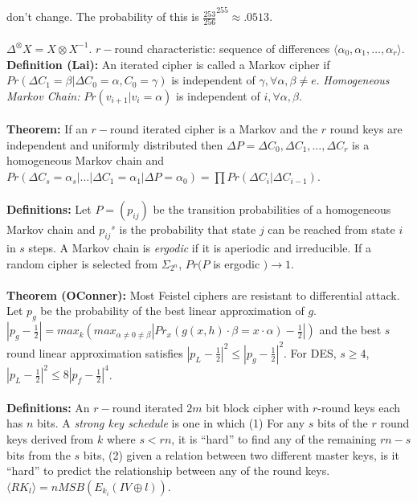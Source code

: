 don't change.  The probability of this is ${\frac {253} {256}}^{255} \approx .0513$.
\\
\\
$\Delta^{\otimes}X =  X \otimes X^{-1}$.  $r-$round characteristic:  sequence of differences
$\langle \alpha_0, \alpha_1 , \ldots , \alpha_r \rangle$.
{\bf Definition (Lai):} An iterated cipher is called a Markov cipher if 
$Pr( \Delta C_1= \beta | \Delta C_0= \alpha, C_0= \gamma)$ is independent of 
$\gamma, \forall \alpha , \beta \ne e$.  \emph{Homogeneous Markov Chain:}
$Pr(v_{i+1} | v_i= \alpha)$ is independent of $i, \forall \alpha, \beta$.
\\
\\
{\bf Theorem:}
If an $r-$round iterated cipher is a Markov and the $r$ round keys are independent and
uniformly distributed then $\Delta P= \Delta C_0, \Delta C_1 , \ldots, \Delta C_r$
is a homogeneous Markov chain and
$Pr(\Delta C_s = \alpha_s | \ldots | \Delta C_1= \alpha_1 | \Delta P= \alpha_0)
= \prod Pr(\Delta C_i | \Delta C_{i-1})$.
\\
\\
{\bf Definitions:}
Let $P= (p_{ij})$ be the transition probabilities of a homogeneous Markov chain and
${p_{ij}}^s$ is the probability that state $j$ can be reached from state $i$ in
$s$ steps.  A Markov chain is \emph{ergodic} if it is aperiodic and irreducible.
If a random cipher is selected from $\Sigma_{2^n}$, $Pr( P$ is ergodic $) \rightarrow 1$.
\\
\\
{\bf Theorem (OConner):} Most Feistel ciphers are resistant to differential attack.  Let
$p_g$ be the probability of the best linear approximation of $g$.
$|p_g - {\frac 1 2}| = max_k (max_{\alpha \ne 0 \ne \beta} | Pr_x(g(x,h) \cdot \beta 
= x \cdot \alpha)- {\frac 1 2}|)$ and the best $s$ round linear approximation
satisfies $|p_L -{\frac 1 2}|^2 \le |p_g - {\frac 1 2}|^2$.  For DES, $s \ge 4$,
$|p_L - {\frac 1 2}|^2 \le 8|p_f -{\frac 1 2}|^4$.
\\
\\
{\bf Definitions:}
An $r-$round iterated $2m$ bit block cipher with $r$-round keys each has
$n$ bits.  A \emph{strong key schedule} is one in which
(1) For any $s$ bits of the $r$ round keys derived from $k$ where $s<rn$, it is ``hard''
to find any of the remaining $rn-s$ bits from the $s$ bits, (2) given a relation between
two different master keys, is it ``hard'' to predict the relationship between any of the 
round keys.  $\langle RK_l \rangle= n MSB(E_{k_i}(IV \oplus l))$.
\\
\\
